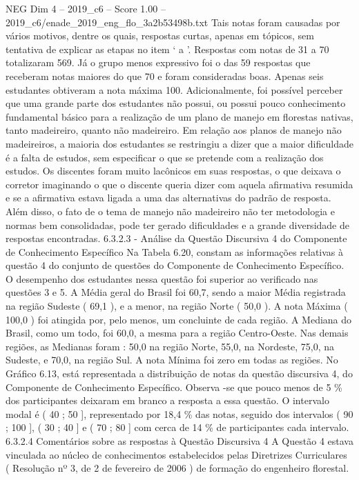 \begin{textsample}{NEG Dim 4 – 2019\_c6 – Score 1.00 – 2019\_c6/enade\_2019\_eng\_flo\_3a2b53498b.txt}
Tais notas foram causadas por vários motivos, dentre os quais, respostas curtas, apenas em tópicos, sem tentativa de explicar as etapas no item ‘ a ’.
Respostas com notas de 31 a 70 totalizaram 569.
Já o grupo menos expressivo foi o das 59 respostas que receberam notas maiores do que 70 e foram consideradas boas.
Apenas seis estudantes obtiveram a nota máxima 100.
Adicionalmente, foi possível perceber que uma grande parte dos estudantes não possui, ou possui pouco conhecimento fundamental básico para a realização de um plano de manejo em florestas nativas, tanto madeireiro, quanto não madeireiro.
Em relação aos planos de manejo não madeireiros, a maioria dos estudantes se restringiu a dizer que a maior dificuldade é a falta de estudos, sem especificar o que se pretende com a realização dos estudos.
Os discentes foram muito lacônicos em suas respostas, o que deixava o corretor imaginando o que o discente queria dizer com aquela afirmativa resumida e se a afirmativa estava ligada a uma das alternativas do padrão de resposta.
Além disso, o fato de o tema de manejo não madeireiro não ter metodologia e normas bem consolidadas, pode ter gerado dificuldades e a grande diversidade de respostas encontradas. 6.3.2.3 - Análise da Questão Discursiva 4 do Componente de Conhecimento Específico Na Tabela 6.20, constam as informações relativas à questão 4 do conjunto de questões do Componente de Conhecimento Específico.
O desempenho dos estudantes nessa questão foi superior ao verificado nas questões 3 e 5.
A Média geral do Brasil foi 60,7, sendo a maior Média registrada na região Sudeste ( 69,1 ), e a menor, na região Norte ( 50,0 ).
A nota Máxima ( 100,0 ) foi atingida por, pelo menos, um concluinte de cada região.
A Mediana do Brasil, como um todo, foi 60,0, a mesma para a região Centro-Oeste.
Nas demais regiões, as Medianas foram : 50,0 na região Norte, 55,0, na Nordeste, 75,0, na Sudeste, e 70,0, na região Sul.
A nota Mínima foi zero em todas as regiões.
No Gráfico 6.13, está representada a distribuição de notas da questão discursiva 4, do Componente de Conhecimento Específico.
Observa -se que pouco menos de 5 \% dos participantes deixaram em branco a resposta a essa questão.
O intervalo modal é ( 40 ; 50 ], representado por 18,4 \% das notas, seguido dos intervalos ( 90 ; 100 ], ( 30 ; 40 ] e ( 70 ; 80 ] com cerca de 14 \% de participantes cada intervalo. 6.3.2.4 Comentários sobre as respostas à Questão Discursiva 4 A Questão 4 estava vinculada ao núcleo de conhecimentos estabelecidos pelas Diretrizes Curriculares ( Resolução nº 3, de 2 de fevereiro de 2006 ) de formação do engenheiro florestal.

\end{textsample}
